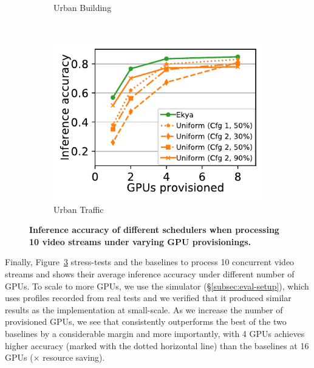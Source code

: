 \begin{figure}
\begin{subfigure}[t]{0.47\linewidth}
    \caption{\small Urban Building}
    \label{fig:scalability-gpus-lasvegas-golden}
  \end{subfigure}
  ~~~
  \begin{subfigure}[t]{0.47\linewidth}
    \centering
    \includegraphics[width=\linewidth]{ekya/results/multicam/bellevue_10cam_scheduler_comparison_across_resources.pdf} 
    \caption{\small Urban Traffic}
    \label{fig:scalability-gpus-bellevue-golden}
  \end{subfigure}
  \caption{\small \bf Inference accuracy of different schedulers when processing 10 video streams under varying GPU provisionings.
  }
  \label{fig:scalability-gpus}
\end{figure}


Finally, Figure~\ref{fig:scalability-gpus} stress-tests \name and the \fair baselines to process 10 concurrent video streams and shows their average inference accuracy under different number of GPUs. 
To scale to more GPUs, we use the simulator (\S\ref{subsec:eval-setup}), which uses profiles recorded from real tests and we verified that it produced similar results as the implementation at small-scale.
As we increase the number of provisioned GPUs, we see that \name consistently outperforms the best of the two baselines by a considerable margin and more importantly, with 4 GPUs \name achieves higher accuracy (marked with the dotted horizontal line) than the baselines at 16 GPUs ($\times$ resource saving).


